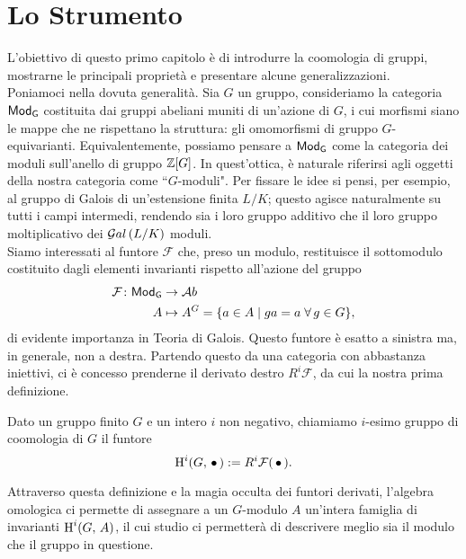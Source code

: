 \chapter{Lo Strumento}


L'obiettivo di questo primo capitolo è di introdurre la coomologia di gruppi, mostrarne le principali proprietà e presentare alcune generalizzazioni.\\

Poniamoci nella dovuta generalità. Sia $ G $ un gruppo, consideriamo la categoria $ \mathsf{Mod}_\mathsf{G} $ costituita dai gruppi abeliani muniti di un'azione di $ G $, i cui morfismi siano le mappe che ne rispettano la struttura: gli omomorfismi di gruppo $ G $-equivarianti. Equivalentemente, possiamo pensare a $ \mathsf{Mod}_\mathsf{G} $ come la categoria dei moduli sull'anello di gruppo $ \mathbb{Z}[G] $. In quest'ottica, è naturale riferirsi agli oggetti della nostra categoria come \textquotedblleft$ G $-moduli".
Per fissare le idee si pensi, per esempio, al gruppo di Galois di un'estensione finita $ L/K $; questo agisce naturalmente su tutti i campi intermedi, rendendo sia i loro gruppo additivo che il loro gruppo moltiplicativo dei $ \mathcal{G}al\left( L/K \right) $ moduli. \\

Siamo interessati al funtore $ \mathcal{F} $ che, preso un modulo, restituisce il sottomodulo costituito dagli elementi invarianti rispetto all'azione del gruppo
\begin{align*} 
\mathcal{F} \colon \mathsf{Mod}_\mathsf{G} &\to \mathcal{A}b \\
A &\mapsto A^G = \{ a \in A \mid ga = a \; \forall \, g \in G \},
\end{align*}
di evidente importanza in Teoria di Galois. Questo funtore è esatto a sinistra ma, in generale, non a destra. Partendo questo da una categoria con abbastanza iniettivi, ci è concesso prenderne il derivato destro $ R^i\mathcal{F} $, da cui la nostra prima definizione.

\begin{definition}
	Dato un gruppo finito $ G $ e un intero $ i $ non negativo, chiamiamo $ i $-esimo gruppo di coomologia di $ G $ il funtore
	\[ \operatorname{H}^i(G, \, \bullet\,) : = R^i\mathcal{F}(\,\bullet\,). \]
\end{definition}

Attraverso questa definizione e la magia occulta dei funtori derivati, l'algebra omologica ci permette di assegnare a un $ G $-modulo $ A $ un'intera famiglia di invarianti $ \operatorname{H}^i(G, \, A) $, il cui studio ci permetterà di descrivere meglio sia il modulo che il gruppo in questione. 


